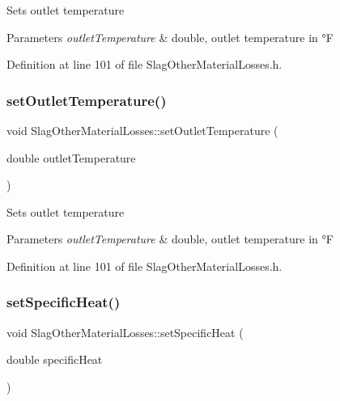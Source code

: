 Sets outlet temperature 
\begin{DoxyParams}{Parameters}
{\em outlet\+Temperature} & double, outlet temperature in °F \\
\hline
\end{DoxyParams}


Definition at line 101 of file Slag\+Other\+Material\+Losses.\+h.

\mbox{\label{class_slag_other_material_losses_afae6aafff94d02926135fabf20a87070}} 
\subsubsection{\texorpdfstring{set\+Outlet\+Temperature()}{setOutletTemperature()}\hspace{0.1cm}{\footnotesize\ttfamily [3/3]}}
{\footnotesize\ttfamily void Slag\+Other\+Material\+Losses\+::set\+Outlet\+Temperature (\begin{DoxyParamCaption}\item[{double}]{outlet\+Temperature }\end{DoxyParamCaption})\hspace{0.3cm}{\ttfamily [inline]}}

Sets outlet temperature 
\begin{DoxyParams}{Parameters}
{\em outlet\+Temperature} & double, outlet temperature in °F \\
\hline
\end{DoxyParams}


Definition at line 101 of file Slag\+Other\+Material\+Losses.\+h.

\mbox{\label{class_slag_other_material_losses_a05488997f264a74afe3229250a286f92}} 
\subsubsection{\texorpdfstring{set\+Specific\+Heat()}{setSpecificHeat()}\hspace{0.1cm}{\footnotesize\ttfamily [1/3]}}
{\footnotesize\ttfamily void Slag\+Other\+Material\+Losses\+::set\+Specific\+Heat (\begin{DoxyParamCaption}\item[{double}]{specific\+Heat }\end{DoxyParamCaption})\hspace{0.3cm}{\ttfamily [inline]}}

